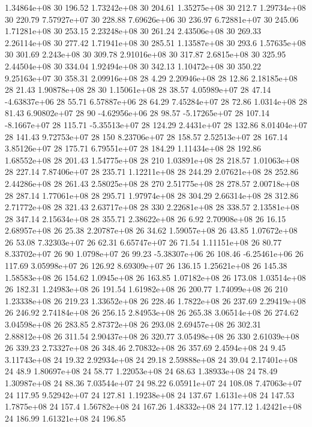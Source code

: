 1.34864e+08 30 196.52
1.73242e+08 30 204.61
1.35275e+08 30 212.7
1.29734e+08 30 220.79
7.57927e+07 30 228.88
7.69626e+06 30 236.97
6.72881e+07 30 245.06
1.71281e+08 30 253.15
2.23248e+08 30 261.24
2.43506e+08 30 269.33
2.26114e+08 30 277.42
1.71941e+08 30 285.51
1.13587e+08 30 293.6
1.57635e+08 30 301.69
2.243e+08 30 309.78
2.91016e+08 30 317.87
2.6815e+08 30 325.95
2.44504e+08 30 334.04
1.92494e+08 30 342.13
1.10472e+08 30 350.22
9.25163e+07 30 358.31
2.09916e+08 28 4.29
2.20946e+08 28 12.86
2.18185e+08 28 21.43
1.90878e+08 28 30
1.15061e+08 28 38.57
4.05989e+07 28 47.14
-4.63837e+06 28 55.71
6.57887e+06 28 64.29
7.45284e+07 28 72.86
1.0314e+08 28 81.43
6.90802e+07 28 90
-4.62956e+06 28 98.57
-5.17265e+07 28 107.14
-8.1667e+07 28 115.71
-5.35513e+07 28 124.29
2.4431e+07 28 132.86
8.01404e+07 28 141.43
9.72753e+07 28 150
8.23706e+07 28 158.57
2.52513e+07 28 167.14
3.85126e+07 28 175.71
6.79551e+07 28 184.29
1.11434e+08 28 192.86
1.68552e+08 28 201.43
1.54775e+08 28 210
1.03891e+08 28 218.57
1.01063e+08 28 227.14
7.87406e+07 28 235.71
1.12211e+08 28 244.29
2.07621e+08 28 252.86
2.44286e+08 28 261.43
2.58025e+08 28 270
2.51775e+08 28 278.57
2.00718e+08 28 287.14
1.77061e+08 28 295.71
1.97974e+08 28 304.29
2.66314e+08 28 312.86
2.71772e+08 28 321.43
2.63717e+08 28 330
2.22681e+08 28 338.57
2.13581e+08 28 347.14
2.15634e+08 28 355.71
2.38622e+08 26 6.92
2.70908e+08 26 16.15
2.68957e+08 26 25.38
2.20787e+08 26 34.62
1.59057e+08 26 43.85
1.07672e+08 26 53.08
7.32303e+07 26 62.31
6.65747e+07 26 71.54
1.11151e+08 26 80.77
8.33702e+07 26 90
1.0798e+07 26 99.23
-5.38307e+06 26 108.46
-6.25461e+06 26 117.69
3.05998e+07 26 126.92
8.69309e+07 26 136.15
1.25621e+08 26 145.38
1.58583e+08 26 154.62
1.0945e+08 26 163.85
1.07182e+08 26 173.08
1.03514e+08 26 182.31
1.24983e+08 26 191.54
1.61982e+08 26 200.77
1.74099e+08 26 210
1.23338e+08 26 219.23
1.33652e+08 26 228.46
1.7822e+08 26 237.69
2.29419e+08 26 246.92
2.74184e+08 26 256.15
2.84953e+08 26 265.38
3.06514e+08 26 274.62
3.04598e+08 26 283.85
2.87372e+08 26 293.08
2.69457e+08 26 302.31
2.88812e+08 26 311.54
2.90437e+08 26 320.77
3.05498e+08 26 330
2.61039e+08 26 339.23
2.73327e+08 26 348.46
2.70832e+08 26 357.69
2.4594e+08 24 9.45
3.11743e+08 24 19.32
2.92934e+08 24 29.18
2.59888e+08 24 39.04
2.17401e+08 24 48.9
1.80697e+08 24 58.77
1.22053e+08 24 68.63
1.38933e+08 24 78.49
1.30987e+08 24 88.36
7.03544e+07 24 98.22
6.05911e+07 24 108.08
7.47063e+07 24 117.95
9.52942e+07 24 127.81
1.19238e+08 24 137.67
1.6131e+08 24 147.53
1.7875e+08 24 157.4
1.56782e+08 24 167.26
1.48332e+08 24 177.12
1.42421e+08 24 186.99
1.61321e+08 24 196.85
